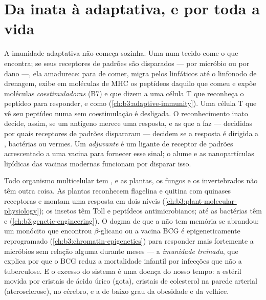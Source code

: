 \section{Da inata à adaptativa, e por toda a vida}

\begin{proposition}\label{prop:b3:innate-immunity:bridge}
A imunidade adaptativa não começa sozinha. Uma \emph{}
num tecido come o que encontra; se seus receptores de padrões são
disparados --- por micróbio ou por dano ---, ela amadurece: para de
comer, migra pelos linfáticos até o linfonodo de drenagem, exibe em
moléculas de MHC os peptídeos daquilo que comeu e expõe moléculas
\emph{coestimuladoras} (B7) e  que dizem a uma célula T que
reconheça o peptídeo para responder, e como
(\cref{ch:b3:adaptive-immunity}). Uma célula T que vê seu peptídeo numa
 sem coestimulação é desligada. O reconhecimento inato
decide, assim, se um antígeno merece uma resposta, e as  que a
 faz --- decididas por quais receptores de padrões
dispararam --- decidem se a resposta é dirigida a , bactérias ou
vermes. Um \emph{adjuvante} é um ligante de receptor de padrões
acrescentado a uma vacina para fornecer esse sinal; o alume e as
nanopartículas lipídicas das vacinas modernas funcionam por disparar
isso.
\end{proposition}

\begin{remark}\label{rem:b3:innate-immunity:everywhere}
Todo organismo multicelular tem , e as plantas, os
fungos e os invertebrados não têm outra coisa. As plantas reconhecem
flagelina e quitina com quinases receptoras e montam uma resposta em
dois níveis (\cref{ch:b3:plant-molecular-physiology}); os insetos têm
Toll e peptídeos antimicrobianos; até as bactérias têm  e  (\cref{ch:b3:genetic-engineering}). O dogma de que a
 não tem memória se abrandou: um monócito que encontrou
$\beta$-glicano ou a vacina BCG é epigeneticamente reprogramado
(\cref{ch:b3:chromatin-epigenetics}) para responder mais fortemente a
micróbios sem relação alguma durante meses --- a \emph{imunidade
treinada}, que explica por que o BCG reduz a mortalidade infantil por
infecções que não a tuberculose. E o excesso do sistema é uma doença do
nosso tempo: a  estéril movida por cristais de ácido úrico
(gota), cristais de colesterol na parede arterial (aterosclerose),
 no cérebro, e a  de baixo grau da obesidade e da
velhice.
\end{remark}

